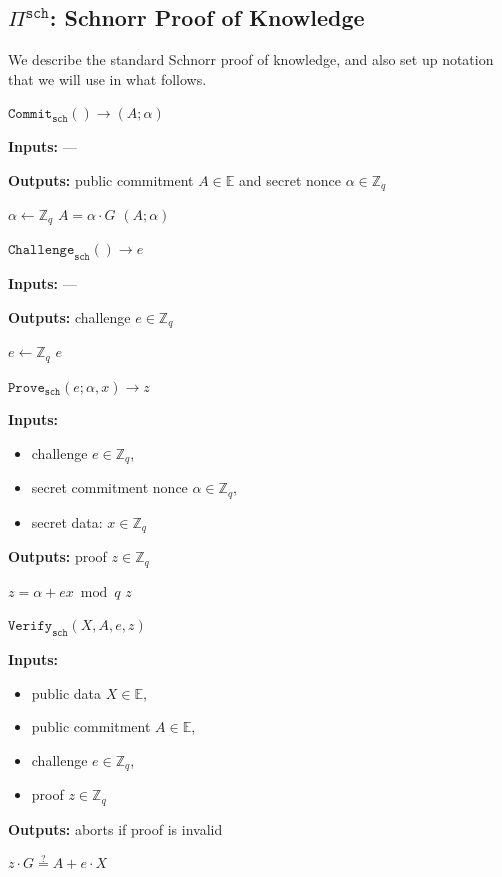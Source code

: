 \documentclass[11pt]{article}
\newenvironment{inlineAlgorithm}{}{}
\newcommand{\algoName}[1]{#1 \par}
\newcommand{\algoInputs}[1]{
    {\small \bf Inputs:} #1 \par
}
\newcommand{\algoInputsList}[1]{
    {\small \bf Inputs:} 
        \begin{itemize}[noitemsep,topsep=0pt]
            #1
        \end{itemize}
}
\newcommand{\algoOutputs}[1]{
    {\small \bf Outputs:} #1 \par
}
\newcommand{\proof}[1]{\ensuremath{\Pi^{\mathtt{#1}}}}
\newcommand{\commit}[1]{\ensuremath{\mathtt{Commit}_{\mathtt{#1}}}}
\newcommand{\challenge}[1]{\ensuremath{\mathtt{Challenge}_{\mathtt{#1}}}}
\newcommand{\prove}[1]{\ensuremath{\mathtt{Prove}_{\mathtt{#1}}}}
\newcommand{\verify}[1]{\ensuremath{\mathtt{Verify}_{\mathtt{#1}}}}
\newcommand{\E}{\mathbb{E}}
\newcommand{\Z}{\mathbb{Z}}
\newcommand{\?}[1]{\stackrel{?}{#1}}
\begin{document}
\subsection{\proof{sch}: Schnorr Proof of Knowledge}
We describe the standard Schnorr proof of knowledge, and also set up notation that we will use in what follows.

\begin{description}

\item
\begin{inlineAlgorithm}
\algoName{$\commit{sch}() \to (A; \alpha)$}
\algoInputs{—}
\algoOutputs{public commitment $A \in \E$ and secret nonce $\alpha \in \Z_q$}
\begin{algorithmic}[1]
\State $\alpha \gets \Z_q$
\State $A = \alpha \cdot G$
\State \Return $(A; \alpha)$
\end{algorithmic}
\end{inlineAlgorithm}

\item
\begin{inlineAlgorithm}
\algoName{$\challenge{sch}() \to e$}
\algoInputs{—}
\algoOutputs{challenge $e \in \Z_q$}
\begin{algorithmic}[1]
\State $e \gets \Z_q$
\State \Return $e$
\end{algorithmic}
\end{inlineAlgorithm}

\item
\begin{inlineAlgorithm}
\algoName{$\prove{sch}(e; \alpha, x) \to z$}
\algoInputsList{
    \item challenge $e \in \Z_q$,
    \item secret commitment nonce $\alpha \in \Z_q$,
    \item secret data: $x \in \Z_q$
}
\algoOutputs{proof $z \in \Z_q$}
\begin{algorithmic}[1]
\State $z = \alpha + e x \bmod q$
\State \Return $z$
\end{algorithmic}
\end{inlineAlgorithm}

\item
\begin{inlineAlgorithm}
\algoName{$\verify{sch}(X, A, e, z)$}
\algoInputsList{
    \item public data $X \in \E$,
    \item public commitment $A \in \E$,
    \item challenge $e \in \Z_q$,
    \item proof $z \in \Z_q$
}
\algoOutputs{aborts if proof is invalid}
\begin{algorithmic}[1]
\State $z \cdot G \? = A + e \cdot X$
\end{algorithmic}
\end{inlineAlgorithm}

\end{description}
\end{document}
